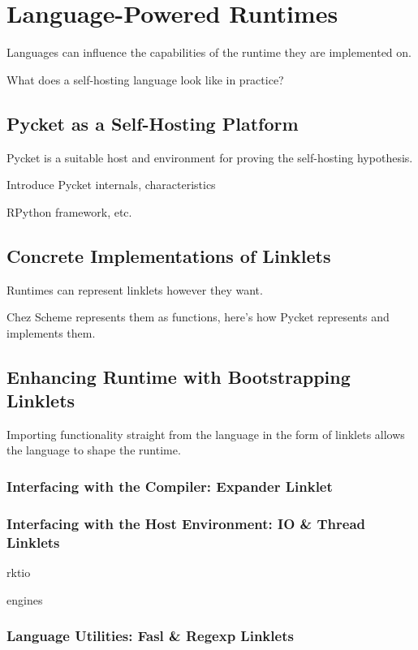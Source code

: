 \chapter{Language-Powered Runtimes}
	\begin{mainpoint}
		Languages can influence the capabilities of the runtime they are implemented on.

		What does a self-hosting language look like in practice?

	\end{mainpoint}

	\section{Pycket as a Self-Hosting Platform}

		\begin{mainpoint}
			Pycket is a suitable host and environment for proving the self-hosting hypothesis.
		\end{mainpoint}

		\begin{placeholder}[TODO]
			Introduce Pycket internals, characteristics
			
			RPython framework, etc.
		\end{placeholder}

	\section{Concrete Implementations of Linklets}

		\begin{mainpoint}
			Runtimes can represent linklets however they want.

			Chez Scheme represents them as functions, here's how Pycket represents and implements them.
		\end{mainpoint}

	\section{Enhancing Runtime with Bootstrapping Linklets}
		\begin{mainpoint}
			Importing functionality straight from the language in the form of linklets allows the language to shape the runtime.
		\end{mainpoint}
		\subsection{Interfacing with the Compiler: Expander Linklet}

		\subsection{Interfacing with the Host Environment: IO \& Thread Linklets}
			\begin{placeholder}[TODO]
				rktio
			\end{placeholder}
			\begin{placeholder}[TODO]
				engines
			\end{placeholder}
		\subsection{Language Utilities: Fasl \& Regexp Linklets}

	